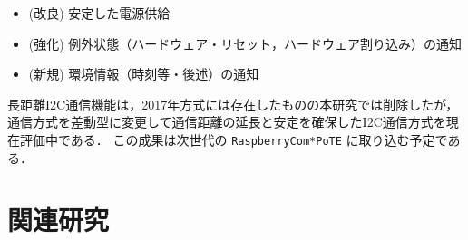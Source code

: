 {\begin{itemize}
\item (改良) 安定した電源供給
\item (強化) 例外状態（ハードウェア・リセット，ハードウェア割り込み）の通知
\item (新規) 環境情報（時刻等・後述）の通知
\end{itemize}

長距離I2C通信機能は，2017年方式には存在したものの本研究では削除したが，通信方式を差動型に変更して通信距離の延長と安定を確保したI2C通信方式を現在評価中である．
この成果は次世代の {\tt Raspberry\-Com*PoTE} に取り込む予定である．





\section{関連研究}
\label{sec:03relatedworks}

}
